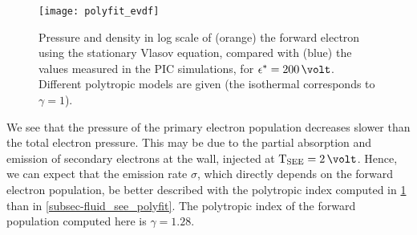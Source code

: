\begin{figure}[hbt]
  \centering
  \texttt{[image: polyfit\_evdf]}
  \caption{Pressure and density in log scale of (orange) the forward electron using the stationary Vlasov equation, compared with (blue) the values measured in the \acs{PIC} simulations, for $\crover=200\,\volt$. Different polytropic models are given (the isothermal corresponds to $\gamma=1$).}
  \label{fig-evdf_polyfit}
\end{figure}

We see that the pressure of the primary electron population decreases slower than the total electron pressure.
This may be due to the partial absorption and emission of secondary electrons at the wall, injected at $\Tsee=2\,\volt$.
Hence, we can expect that the emission rate $\sigma$, which directly depends on the forward electron population, be better described with the polytropic index computed in \cref{fig-evdf_polyfit} than in \cref{subsec-fluid_see_polyfit}.
The polytropic index of the forward population computed here is $\gamma=1.28$.

